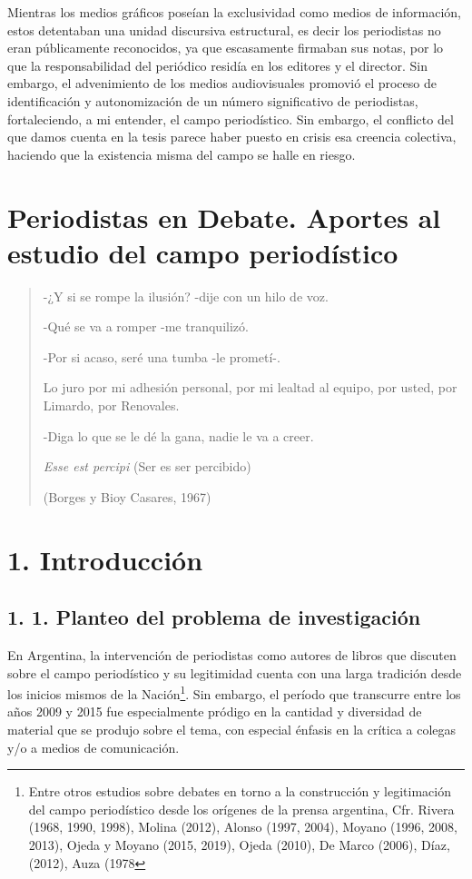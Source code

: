 Mientras los medios gráficos poseían la exclusividad como medios de información, estos detentaban una unidad discursiva estructural, es decir los periodistas no eran públicamente reconocidos, ya que escasamente firmaban sus notas, por lo que la responsabilidad del periódico residía en los editores y el director. Sin embargo, el advenimiento de los medios audiovisuales promovió el proceso de identificación y autonomización de un número significativo de periodistas, fortaleciendo, a mi entender, el campo periodístico. Sin embargo, el conflicto del que damos cuenta en la tesis parece haber puesto en crisis esa creencia colectiva, haciendo que la existencia misma del campo se halle en riesgo.

\mainmatter

\chapter{Periodistas en Debate. Aportes al estudio del campo periodístico}

\begin{quote}
-¿Y si se rompe la ilusión? -dije con un hilo de voz.

-Qué se va a romper -me tranquilizó.

-Por si acaso, seré una tumba -le prometí-.

Lo juro por mi adhesión personal, por mi lealtad al equipo, por usted, por Limardo, por Renovales.

-Diga lo que se le dé la gana, nadie le va a creer.

\emph{Esse est percipi} (Ser es ser percibido)

(Borges y Bioy Casares, 1967)
\end{quote}

\chapter{1. Introducción}

\section{1. 1. Planteo del problema de investigación}

En Argentina, la intervención de periodistas como autores de libros que discuten sobre el campo periodístico y su legitimidad cuenta con una larga tradición desde los inicios mismos de la Nación\footnote{Entre otros estudios sobre debates en torno a la construcción y legitimación del campo periodístico desde los orígenes de la prensa argentina, Cfr. Rivera (1968, 1990, 1998), Molina (2012), Alonso (1997, 2004), Moyano (1996, 2008, 2013), Ojeda y Moyano (2015, 2019), Ojeda (2010), De Marco (2006), Díaz, (2012), Auza (1978}. Sin embargo, el período que transcurre entre los años 2009 y 2015 fue especialmente pródigo en la cantidad y diversidad de material que se produjo sobre el tema, con especial énfasis en la crítica a colegas y/o a medios de comunicación.

